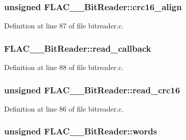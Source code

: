 \subsubsection[{\texorpdfstring{crc16\+\_\+align}{crc16_align}}]{\setlength{\rightskip}{0pt plus 5cm}unsigned F\+L\+A\+C\+\_\+\+\_\+\+Bit\+Reader\+::crc16\+\_\+align}\hypertarget{struct_f_l_a_c_____bit_reader_ae02c8b7b3088a28cd76d2c63cd7fdb7d}{}\label{struct_f_l_a_c_____bit_reader_ae02c8b7b3088a28cd76d2c63cd7fdb7d}


Definition at line 87 of file bitreader.\+c.

\subsubsection[{\texorpdfstring{read\+\_\+callback}{read_callback}}]{ F\+L\+A\+C\+\_\+\+\_\+\+Bit\+Reader\+::read\+\_\+callback}\hypertarget{struct_f_l_a_c_____bit_reader_ad533a2853a46d2204805798b89a17aab}{}\label{struct_f_l_a_c_____bit_reader_ad533a2853a46d2204805798b89a17aab}


Definition at line 88 of file bitreader.\+c.

\subsubsection[{\texorpdfstring{read\+\_\+crc16}{read_crc16}}]{\setlength{\rightskip}{0pt plus 5cm}unsigned F\+L\+A\+C\+\_\+\+\_\+\+Bit\+Reader\+::read\+\_\+crc16}\hypertarget{struct_f_l_a_c_____bit_reader_a2d84d8d8813d1a43f6103dbac53bf260}{}\label{struct_f_l_a_c_____bit_reader_a2d84d8d8813d1a43f6103dbac53bf260}


Definition at line 86 of file bitreader.\+c.

\subsubsection[{\texorpdfstring{words}{words}}]{\setlength{\rightskip}{0pt plus 5cm}unsigned F\+L\+A\+C\+\_\+\+\_\+\+Bit\+Reader\+::words}\hypertarget{struct_f_l_a_c_____bit_reader_ab0b2525d374daa1d4a28f5ad9c96335c}{}\label{struct_f_l_a_c_____bit_reader_ab0b2525d374daa1d4a28f5ad9c96335c}


